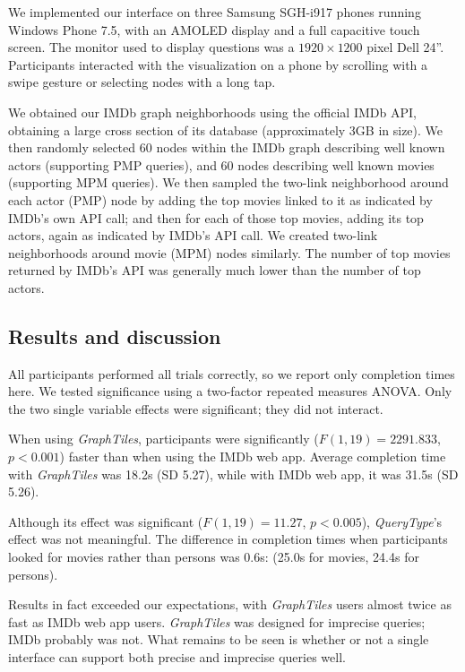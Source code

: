 \documentclass{sigchi}
\begin{document}
We implemented our interface on three Samsung SGH-i917 phones running Windows Phone 7.5, with an AMOLED display and a full capacitive touch screen. The monitor used to display questions was a $1920 \times 1200$ pixel Dell 24''. Participants interacted with the visualization on a phone by scrolling with a swipe gesture or selecting nodes with a long tap.

We obtained our IMDb graph neighborhoods using the official IMDb API, obtaining a large cross section of its database (approximately 3GB in size). We then randomly selected 60 nodes within the IMDb graph describing well known actors (supporting PMP queries), and 60 nodes describing well known movies (supporting MPM queries). We then sampled the two-link neighborhood around each actor (PMP) node by adding the top movies linked to it as indicated by IMDb's own API call; and then for each of those top movies, adding its top actors, again as indicated by IMDb's API call. We created two-link neighborhoods around movie (MPM) nodes similarly. The number of top movies returned by IMDb's API was generally much lower than the number of top actors. 


\subsection{Results and discussion}

All participants performed all trials correctly, so we report only completion times here. We tested significance using a two-factor repeated measures ANOVA. Only the two single variable effects were significant; they did not interact. 

When using \textit{GraphTiles}, participants were significantly ($F(1,19)=2291.833$, $p<0.001$) faster than when using the IMDb web app. Average completion time with \textit{GraphTiles} was 18.2s (SD 5.27), while with IMDb web app, it was 31.5s (SD 5.26).

Although its effect was significant ($F(1,19)=11.27$, $p<0.005$), \textit{QueryType}'s effect was not meaningful. The difference in completion times when participants looked for movies rather than persons was 0.6s: (25.0s for movies, 24.4s for persons). 


Results in fact exceeded our expectations, with \textit{GraphTiles} users almost twice as fast as IMDb web app users. \textit{GraphTiles} was designed for imprecise queries; IMDb probably was not. What remains to be seen is whether or not a single interface can support both precise and imprecise queries well.
\end{document}
